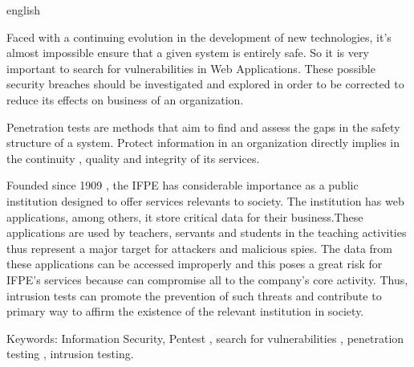 \documentclass[
    12pt,               %
    openright,          %
    oneside,            %
    a4paper,            %
    section=TITLE,     %
    english,            %
    french,             %
    spanish,            %
    brazil              %
    ]{abntex2}
\newcommand{\citep}{\cite}
\begin{document}
\begin{resumo}[Abstract]
 \begin{otherlanguage*}{english}
   
   
   Faced with a continuing evolution in the development of new technologies, it's almost impossible ensure that a given system is entirely safe. So it is very important to search for vulnerabilities in Web Applications. These possible security breaches should be investigated and explored in order to be corrected to reduce its effects on business of an organization.

 
Penetration tests are methods that aim to find and assess the gaps in the safety structure of a system. Protect information in an organization directly implies in the continuity , quality and integrity of its services.


Founded since 1909 \citep{62952}, the IFPE has considerable importance as a public institution designed to offer services relevants to society. The institution has web applications, among others, it store critical data for their business.These applications are used by teachers, servants and students in the teaching activities thus represent a major target for attackers and malicious spies. The data from these applications can be accessed improperly and this poses a great risk for IFPE's services because can compromise all to the company's core activity. Thus, intrusion tests can promote the prevention of such threats and contribute to primary way to affirm the existence of the relevant institution in society.


























Keywords: Information Security, Pentest , search for vulnerabilities , penetration testing , intrusion testing.


 \end{otherlanguage*}
\end{resumo}



\end{document}
